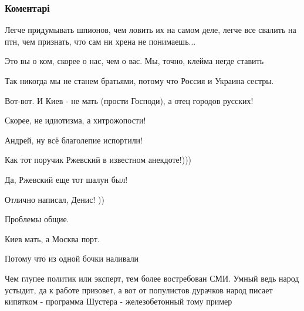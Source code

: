  
 
 
 
 
\subsubsection{Коментарі}
\label{sec:30_12_2014.fb.zharkih_denis.1.ukr_idiotizm.cmt}

\begin{itemize} %
Легче придумывать шпионов, чем ловить их на самом деле, легче все свалить на птн, чем признать, что сам ни хрена не понимаешь...

Это вы о ком, скорее о нас, чем о вас. Мы, точно, клейма негде ставить

Так никогда мы не станем братьями, потому что Россия и Украина сестры.

Вот-вот. И Киев - не мать (прости Господи), а отец городов русских!

Скорее, не идиотизма, а хитрожопости!

Андрей, ну всё благолепие испортили!

Как тот поручик Ржевский в известном анекдоте!)))

Да, Ржевский еще тот шалун был!

Отлично написал, Денис! ))

Проблемы общие.

Киев мать, а Москва порт.

Потому что из одной бочки наливали


Чем глупее политик или эксперт, тем более востребован СМИ. Умный ведь народ
устыдит, да к работе призовет, а вот от популистов дурачков народ писает
кипятком - программа Шустера - железобетонный тому пример

\end{itemize} %
